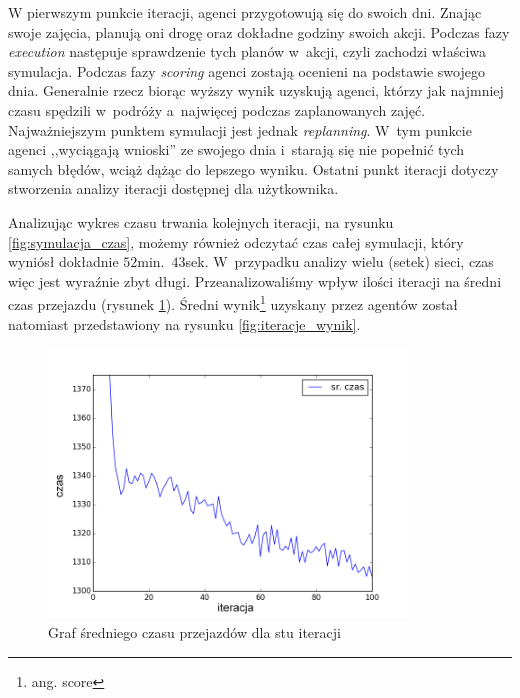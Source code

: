 \documentclass[twoside,12pt]{report}
\begin{document}
W pierwszym punkcie iteracji, agenci przygotowują się do swoich dni. Znając swoje zajęcia, planują oni drogę oraz dokładne godziny swoich akcji. Podczas fazy \textit{execution} następuje sprawdzenie tych planów w~akcji, czyli zachodzi właściwa symulacja. Podczas fazy \textit{scoring} agenci zostają ocenieni na podstawie swojego dnia. Generalnie rzecz biorąc wyższy wynik uzyskują agenci, którzy jak najmniej czasu spędzili w~podróży a~najwięcej podczas zaplanowanych zajęć. Najważniejszym punktem symulacji jest jednak \textit{replanning}. W~tym punkcie agenci ,,wyciągają wnioski'' ze swojego dnia i~starają się nie popełnić tych samych błędów, wciąż dążąc do lepszego wyniku. Ostatni punkt iteracji dotyczy stworzenia analizy iteracji dostępnej dla użytkownika.

Analizując wykres czasu trwania kolejnych iteracji, na rysunku \ref{fig:symulacja_czas}, możemy również odczytać czas całej symulacji, który wyniósł dokładnie $52$min.~$43$sek.  W~przypadku analizy wielu (setek) sieci, czas więc jest wyraźnie zbyt długi. Przeanalizowaliśmy wpływ ilości iteracji na średni czas przejazdu (rysunek \ref{fig:iteracje_czas}). Średni wynik\footnote{ang. score} uzyskany przez agentów został natomiast przedstawiony na rysunku \ref{fig:iteracje_wynik}.


\begin{figure}[ht]
\centering
\includegraphics[width=0.85\textwidth]{img/def_iters}
\caption{Graf średniego czasu przejazdów dla stu iteracji}
\label{fig:iteracje_czas}
\end{figure}
\end{document}
